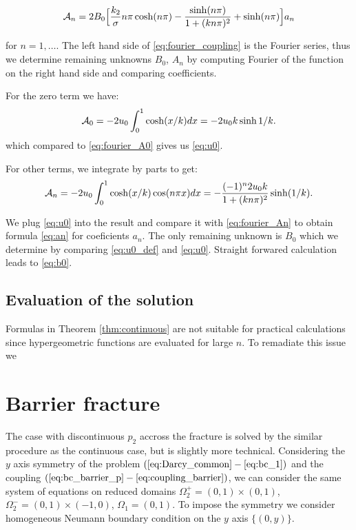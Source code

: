 \documentclass[a4paper,10pt]{article}
\begin{document}
\begin{equation}
    \label{eq:fourier_An} 
        {\cal A}_n = 2B_0 \Bigl[ \frac{k_2}{\sigma} n\pi \cosh(n\pi) - \frac{\sinh(n \pi)}{1 + (k n \pi)^2}  
    + \sinh(n \pi) \Bigr]a_n
\end{equation}

for $n=1, \dots$. The left hand side of \eqref{eq:fourier_coupling} is the Fourier series, thus we determine
remaining unknowns $B_0$, $A_n$ by computing Fourier of the function on the right hand side and comparing coefficients.

For the zero term we have:
\[
{\cal A}_0 = -2 u_0 \int _0^1 \cosh(x/k) dx =
- 2 u_0 k\sinh 1/k.
\]
which compared to \eqref{eq:fourier_A0} gives us \eqref{eq:u0}.


For other terms, we integrate by parts to get:
\[
{\cal A}_n = -2 u_0\int _0^1 \cosh(x/k) \cos (n\pi x) dx 
= -\frac{(-1)^n 2u_0 k}{1+(k n \pi)^2}\sinh(1/k).
\]


We plug \eqref{eq:u0} into the result and compare it with \eqref{eq:fourier_An} to obtain
formula \eqref{eq:an} for coeficients $a_n$.
The only remaining unknown is $B_0$ which we determine by comparing \eqref{eq:u0_def} and \eqref{eq:u0}.
Straight forwared calculation leads to \eqref{eq:b0}.

\subsection{Evaluation of the solution}
Formulas in Theorem \ref{thm:continuous} are not suitable for practical calculations since hypergeometric functions are evaluated for large $n$.
To remadiate this issue we 


\section{Barrier fracture}
\label{sec:barrier_frac}
The case with discontinuous $p_2$ accross the fracture is solved by the similar procedure as the continuous case, 
but is slightly more technical. Considering the $y$ axis symmetry of the problem $(\ref{eq:Darcy_common} - \ref{eq:bc_1})$ and 
the coupling $(\ref{eq:bc_barrier_p} - \ref{eq:coupling_barrier})$, we can consider the same system of equations 
on reduced domains $\Omega_2^+ = (0,1)\times (0,1)$, $\Omega_2^- = (0,1)\times(-1,0)$,
$\Omega_1 = (0,1)$. To impose the symmetry we consider homogeneous Neumann boundary condition on the $y$ axis $\{(0,y)\}$.
\end{document}
